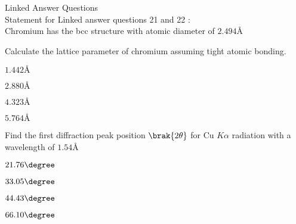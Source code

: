 Linked Answer Questions \\
Statement for  Linked answer questions 21 and 22 :\\
Chromium has the bcc structure with atomic diameter of $2.494 \text{\AA}$
\item %
Calculate the lattice parameter of chromium assuming tight atomic bonding. 
\begin{enumerate}
\begin{multicols}{4}
\item $1.442 \text{\AA}$
\item $2.880 \text{\AA}$
\item $4.323 \text{\AA}$
\item $5.764 \text{\AA}$
\end{multicols}
\end{enumerate}
\item %
Find the first diffraction peak position $\brak{2 \theta}$ for Cu $K\alpha$ radiation with a wavelength of $1.54 \text{\AA}$
\begin{enumerate}
\begin{multicols}{4}
\item $21.76 \degree$
\item $33.05 \degree$
\item $44.43 \degree$
\item $66.10 \degree$
\end{multicols}
\end{enumerate}

